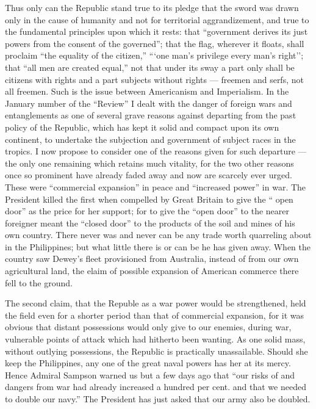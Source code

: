 \documentclass[11pt,openany]{book}
\begin{document}
Thus only can the Republic stand true to its pledge that the sword was drawn only in the cause of humanity and not for territorial aggrandizement, and true to the fundamental principles upon which it rests: that ``government derives its just powers from the consent of the governed''; that the flag, wherever it floats, shall proclaim ``the equality of the citizen,'' ```one man's privilege every man's right''; that ``all men are created equal,'' not that under its sway a part only shall be citizens with rights and a part subjects without rights --- freemen and serfs, not all freemen. Such is the issue between Americanism and Imperialism. In the January number of the ``Review'' I dealt with the danger of foreign wars and entanglements as one of several grave reasons against departing from the past policy of the Republic, which has kept it solid and compact upon its own continent, to undertake the subjection and government of subject races in the tropics. I now propose to consider one of the reasons given for such departure ---the only one remaining which retains much vitality, for the two other reasons once so prominent have already faded away and now are scarcely ever urged. These were ``commercial expansion'' in peace and ``increased power'' in war. The President killed the first when compelled by Great Britain to give the `` open door'' as the price for her support; for to give the ``open door'' to the nearer foreigner meant the ``closed door'' to the products of the soil and mines of his own country. There never was and never can be any trade worth quarreling about in the Philippines; but what little there is or can be he has given away. When the country saw Dewey's fleet provisioned from Australia, instead of from our own agricultural land, the elaim of possible expansion of American commerce there fell to the ground.

The second claim, that the Republe as a war power would be strengthened, held the field even for a shorter period than that of commercial expansion, for it was obvious that distant possessions would only give to our enemies, during war, vulnerable points of attack which had hitherto been wanting. As one solid mass, without outlying possessions, the Republic is practically unassailable. Should she keep the Philippines, any one of the great naval powers has her at its mercy. Hence Admiral Sampson warned us but a few days ago that ``our risks of and dangers from war had already increased a hundred per cent. and that we needed to double our navy.'' The President has just asked that our army also be doubled.
\end{document}
